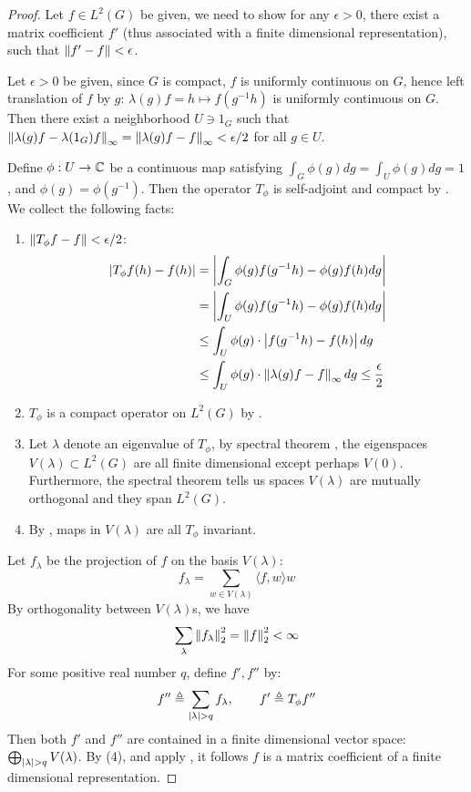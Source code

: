 \begin{proof}
  Let $f \in L^2(G)$ be given, we need to show for any $\epsilon > 0$, there
  exist a matrix coefficient $f'$ (thus associated with a finite dimensional
  representation), such that $\left\lVert f' - f\right\rVert < \epsilon$.

  Let $\epsilon > 0$ be given, since $G$ is compact, $f$ is uniformly continuous
  on $G$, hence left translation of $f$ by $g$: $\lambda(g)f = h \mapsto
  f(g^{-1}h)$ is uniformly continuous on $G$. Then there exist a neighborhood $U
  \ni 1_G$ such that $\left\lVert\lambda(g)f - \lambda(1_G)f\right\rVert_{\infty} =
  \left\lVert\lambda(g)f - f\right\rVert_{\infty} < \epsilon/2$ for all $g \in U$.

  Define $\phi : U \to \operatorname{\mathbb{C}}$ be a continuous map satisfying $\int_G \phi(g) dg = \int_U
  \phi(g) dg = 1$, and $\phi(g) = \phi(g^{-1})$.  Then the operator $T_{\phi}$
  is self-adjoint and compact by . We collect the
  following facts:
  \begin{enumerate}
    \item $\left\lVert T_{\phi}f - f\right\rVert < \epsilon/2$:
      \begin{align*}
        \left|T_{\phi}f(h) - f(h)\right|
        & = \left|\int_G \phi(g) f(g^{-1}h) - \phi(g)f(h) dg\right|\\
        & = \left|\int_U \phi(g) f(g^{-1}h) - \phi(g)f(h) dg\right|\\
        & \leq \int_U \phi(g) \cdot \left|f(g^{-1}h) - f(h)\right| dg\\
        & \leq \int_U \phi(g) \cdot \left\lVert\lambda(g)f - f\right\rVert_{\infty} dg
          \leq \frac{\epsilon}{2}
      \end{align*}

    \item $T_{\phi}$ is a compact operator on $L^2(G)$ by .

    \item 
      Let $\lambda$ denote an eigenvalue of $T_{\phi}$, by spectral theorem
      , the eigenspaces $V(\lambda) \subset L^2(G)$ are all
      finite dimensional except perhaps $V(0)$.  Furthermore, the spectral
      theorem tells us spaces $V(\lambda)$ are mutually orthogonal and they span
      $L^2(G)$.

    \item 
      By , maps in $V(\lambda)$ are all $T_{\phi}$
      invariant.
  \end{enumerate}

  Let $f_\lambda$ be the projection of $f$ on the basis $V(\lambda)$:
  \[
    f_{\lambda} = \sum_{w \in V(\lambda)} \langle f, w \rangle w
  \]
  By orthogonality between $V(\lambda)$s, we have
  \[
    \sum_{\lambda} \left\lVert f_{\lambda}\right\rVert_2^2 = \left\lVert f\right\rVert_2^2 < \infty
  \]
  For some positive real number $q$, define $f', f''$ by:
  \[
    f'' \triangleq \sum_{\left|\lambda\right| > q} f_{\lambda},
    \qquad
    f' \triangleq T_{\phi}f''
  \]
  Then both $f'$ and $f''$ are contained in a finite dimensional vector space:
  $\bigoplus_{\left|\lambda\right| > q} V(\lambda)$.  By (4), and apply
  , it follows $f$ is a matrix coefficient of a finite
  dimensional representation.


\end{proof}
